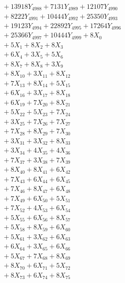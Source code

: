 \documentclass[a4paper,10pt]{article}
\begin{document}
{\begin{align}
&\;  + 13918 Y_{4988} + 7131 Y_{4989} + 12107 Y_{4990} \\[0.3ex]
&\;  + 8222 Y_{4991} + 10444 Y_{4992} + 25350 Y_{4993} \\[0.3ex]
&\;  + 19123 Y_{4994} + 22892 Y_{4995} + 17264 Y_{4996} \\[0.3ex]
&\;  + 25366 Y_{4997} + 10444 Y_{4999} + 8 X_{0} \\[0.3ex]
&\;  + 5 X_{1} + 8 X_{2} + 8 X_{3} \\[0.3ex]
&\;  + 6 X_{4} + 3 X_{5} + 5 X_{6} \\[0.3ex]
&\;  + 8 X_{7} + 8 X_{8} + 3 X_{9} \\[0.5ex]\allowbreak
&\;  + 8 X_{10} + 3 X_{11} + 8 X_{12} \\[0.3ex]
&\;  + 7 X_{13} + 8 X_{14} + 5 X_{15} \\[0.3ex]
&\;  + 6 X_{16} + 3 X_{17} + 8 X_{18} \\[0.3ex]
&\;  + 6 X_{19} + 7 X_{20} + 8 X_{21} \\[0.3ex]
&\;  + 5 X_{22} + 5 X_{23} + 7 X_{24} \\[0.3ex]
&\;  + 3 X_{25} + 7 X_{26} + 7 X_{27} \\[0.3ex]
&\;  + 7 X_{28} + 8 X_{29} + 7 X_{30} \\[0.3ex]
&\;  + 3 X_{31} + 3 X_{32} + 8 X_{33} \\[0.3ex]
&\;  + 3 X_{34} + 4 X_{35} + 4 X_{36} \\[0.3ex]
&\;  + 7 X_{37} + 3 X_{38} + 7 X_{39} \\[0.5ex]\allowbreak
&\;  + 8 X_{40} + 8 X_{41} + 6 X_{42} \\[0.3ex]
&\;  + 7 X_{43} + 6 X_{44} + 6 X_{45} \\[0.3ex]
&\;  + 7 X_{46} + 8 X_{47} + 6 X_{48} \\[0.3ex]
&\;  + 7 X_{49} + 6 X_{50} + 5 X_{51} \\[0.3ex]
&\;  + 7 X_{52} + 4 X_{53} + 6 X_{54} \\[0.3ex]
&\;  + 5 X_{55} + 6 X_{56} + 8 X_{57} \\[0.3ex]
&\;  + 5 X_{58} + 8 X_{59} + 6 X_{60} \\[0.3ex]
&\;  + 5 X_{61} + 3 X_{62} + 6 X_{63} \\[0.3ex]
&\;  + 6 X_{64} + 3 X_{65} + 6 X_{66} \\[0.3ex]
&\;  + 5 X_{67} + 7 X_{68} + 8 X_{69} \\[0.5ex]\allowbreak
&\;  + 8 X_{70} + 6 X_{71} + 5 X_{72} \\[0.3ex]
&\;  + 8 X_{73} + 6 X_{74} + 8 X_{75} \\[0.3ex]

\end{align}}
\end{document}
